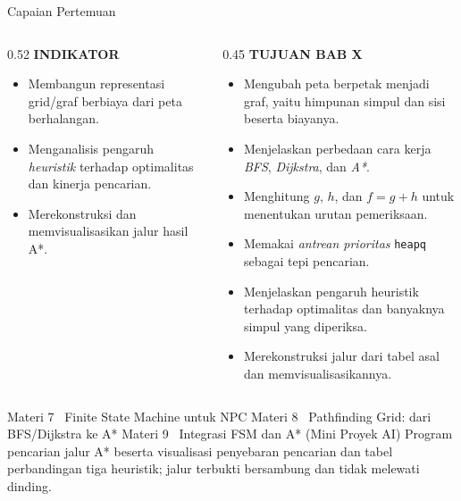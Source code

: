 \documentclass[aspectratio=169,10pt]{beamer}
\begin{document}
\begin{frame}{Capaian Pertemuan}
\begin{columns}[T,onlytextwidth]
\begin{column}{0.52\textwidth}
    {\fontsize{7}{8.5}\selectfont\bfseries\color{ubAccent}INDIKATOR}\par
    \vspace{0.06cm}
    \begin{itemize}
      \item Membangun representasi grid/graf berbiaya dari peta berhalangan.
      \item Menganalisis pengaruh \emph{heuristik} terhadap optimalitas dan
            kinerja pencarian.
      \item Merekonstruksi dan memvisualisasikan jalur hasil A*.
    \end{itemize}
  \end{column}
  \begin{column}{0.45\textwidth}
    {\fontsize{7}{8.5}\selectfont\bfseries\color{ubAccent}TUJUAN BAB X}\par
    \vspace{0.08cm}
    \begin{itemize}
      \item Mengubah peta berpetak menjadi graf, yaitu himpunan simpul dan
            sisi beserta biayanya.
      \item Menjelaskan perbedaan cara kerja \emph{BFS}, \emph{Dijkstra}, dan
            \emph{A*}.
      \item Menghitung $g$, $h$, dan $f = g + h$ untuk menentukan urutan
            pemeriksaan.
      \item Memakai \emph{antrean prioritas} \texttt{heapq} sebagai tepi
            pencarian.
      \item Menjelaskan pengaruh heuristik terhadap optimalitas dan banyaknya
            simpul yang diperiksa.
      \item Merekonstruksi jalur dari tabel asal dan memvisualisasikannya.
    \end{itemize}
  \end{column}
\end{columns}
\end{frame}

  {Materi 7 \textperiodcentered\ Finite State Machine untuk NPC}
  {Materi 8 \textperiodcentered\ Pathfinding Grid: dari BFS/Dijkstra ke A*}
  {Materi 9 \textperiodcentered\ Integrasi FSM dan A* (Mini Proyek AI)}
  {Program pencarian jalur A* beserta visualisasi penyebaran pencarian dan
   tabel perbandingan tiga heuristik; jalur terbukti bersambung dan
   tidak melewati dinding.}
\end{document}

